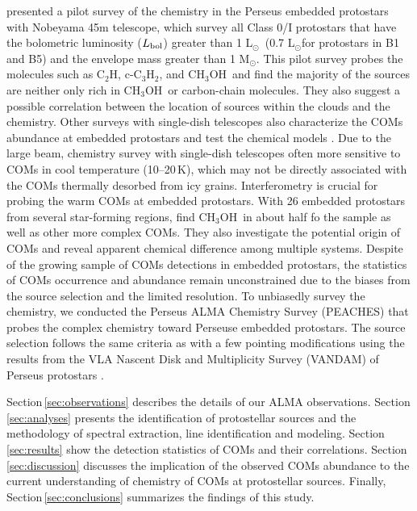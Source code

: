 \documentclass[twocolumn]{aastex62}
\newcommand{\lsun}{\mbox{\,L$_\odot$}}
\newcommand{\msun}{\mbox{\,M$_\odot$}}
\newcommand{\lbol}{\mbox{$L_{\rm bol}$}}
\newcommand{\methanol}{\mbox{CH$_{3}$OH}}
\begin{document}
\citet{2018ApJS..236...52H} presented a pilot survey of the chemistry in the Perseus embedded protostars with Nobeyama 45m telescope, which survey all Class 0/I protostars \citep{2007A&A...468.1009H} that have the bolometric luminosity (\lbol) greater than 1\,\lsun\ (0.7\,\lsun for protostars in B1 and B5) and the envelope mass greater than 1\,\msun.  This pilot survey probes the molecules such as C$_2$H, c-C$_3$H$_2$, and \methanol\ and find the majority of the sources are neither only rich in \methanol\ or carbon-chain molecules.  They also suggest a possible correlation between the location of sources within the clouds and the chemistry.  Other surveys with single-dish telescopes also characterize the COMs abundance at embedded protostars and test the chemical models \citep[e.g., ][]{2017ApJ...841..120B}.  Due to the large beam, chemistry survey with single-dish telescopes often more sensitive to COMs in cool temperature (10--20\,K), which may not be directly associated with the COMs thermally desorbed from icy grains.  Interferometry is crucial for probing the warm COMs at embedded protostars.  With 26 embedded protostars from several star-forming regions, \citet{2020A&A...635A.198B} find \methanol\ in about half fo the sample as well as other more complex COMs.  They also investigate the potential origin of COMs and reveal apparent chemical difference among multiple systems.  Despite of the growing sample of COMs detections in embedded protostars, the statistics of COMs occurrence and abundance remain unconstrained due to the biases from the source selection and the limited resolution.  To unbiasedly survey the chemistry, we conducted the Perseus ALMA Chemistry Survey (PEACHES) that probes the complex chemistry toward Perseuse embedded protostars.  The source selection follows the same criteria as \citet{2018ApJS..236...52H} with a few pointing modifications using the results from the VLA Nascent Disk and Multiplicity Survey (VANDAM) of Perseus protostars \citep{2016ApJ...818...73T}.

Section\,\ref{sec:observations} describes the details of our ALMA observations.  Section\,\ref{sec:analyses} presents the identification of protostellar sources and the methodology of spectral extraction, line identification and modeling.  Section\,\ref{sec:results} show the detection statistics of COMs and their correlations.  Section\,\ref{sec:discussion} discusses the implication of the observed COMs abundance to the current understanding of chemistry of COMs at protostellar sources.  Finally, Section\,\ref{sec:conclusions} summarizes the findings of this study.
\end{document}
